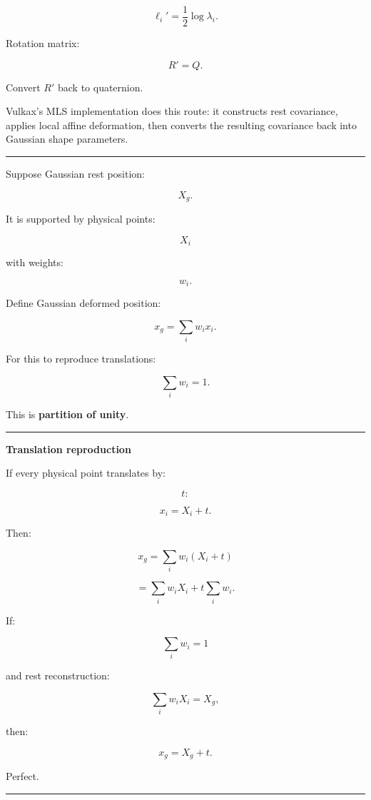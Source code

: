 \[
\boxed{
\ell_i'
=
\frac12
\log\lambda_i.
}
\]

Rotation matrix:

\[
R'=Q.
\]

Convert \(R'\) back to quaternion.

Vulkax's MLS implementation does this route: it constructs rest covariance, applies local affine deformation, then converts the resulting covariance back into Gaussian shape parameters.

\begin{center}\rule{0.5\linewidth}{0.5pt}\end{center}

Suppose Gaussian rest position:

\[
X_g.
\]

It is supported by physical points:

\[
X_i
\]

with weights:

\[
w_i.
\]

Define Gaussian deformed position:

\[
\boxed{
x_g
=
\sum_i
w_i x_i.
}
\]

For this to reproduce translations:

\[
\boxed{
\sum_i w_i=1.
}
\]

This is \textbf{partition of unity}.

\begin{center}\rule{0.5\linewidth}{0.5pt}\end{center}

\textbf{Translation reproduction}

If every physical point translates by:

\[
t:
\]

\[
x_i=X_i+t.
\]

Then:

\[
x_g
=
\sum_i
w_i(X_i+t)
\]

\[
=
\sum_iw_iX_i
+
t\sum_iw_i.
\]

If:

\[
\sum_iw_i=1
\]

and rest reconstruction:

\[
\sum_iw_iX_i=X_g,
\]

then:

\[
\boxed{
x_g=X_g+t.
}
\]

Perfect.

\begin{center}\rule{0.5\linewidth}{0.5pt}\end{center}

